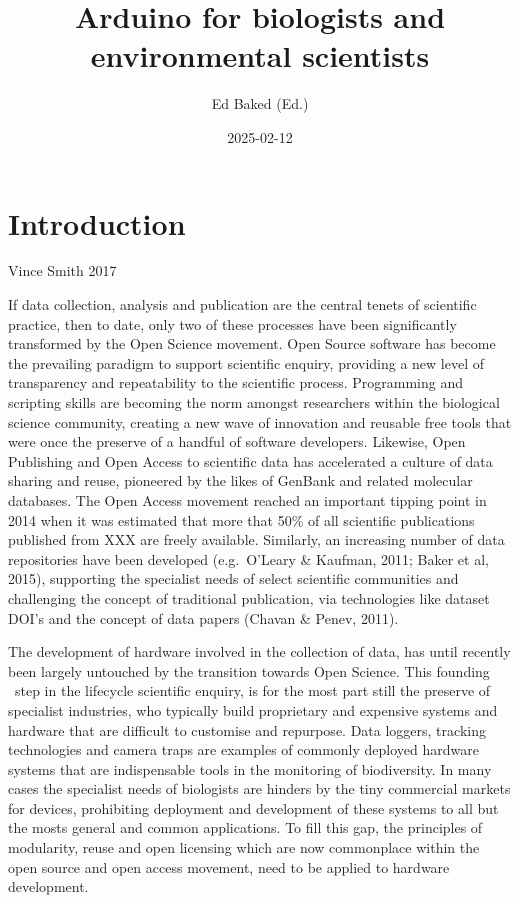 \documentclass[
]{book}
\title{Arduino for biologists and environmental scientists}
\author{Ed Baked (Ed.)}
\date{2025-02-12}
\begin{document}
\maketitle

{
\setcounter{tocdepth}{1}
\tableofcontents
}
\chapter*{Introduction}\label{introduction}

Vince Smith 2017

If data collection, analysis and publication are the central tenets of scientific practice, then to date, only two of these processes have been significantly transformed by the Open Science movement. Open Source software has become the prevailing paradigm to support scientific enquiry, providing a new level of transparency and repeatability to the scientific process. Programming and scripting skills are becoming the norm amongst researchers within the biological science community, creating a new wave of innovation and reusable free tools that were once the preserve of a handful of software developers. Likewise, Open Publishing and Open Access to scientific data has accelerated a culture of data sharing and reuse, pioneered by the likes of GenBank and related molecular databases. The Open Access movement reached an important tipping point in 2014 when it was estimated that more that 50\% of all scientific publications published from XXX are freely available. Similarly, an increasing number of data repositories have been developed (e.g.~O'Leary \& Kaufman, 2011; Baker et al, 2015), supporting the specialist needs of select scientific communities and challenging the concept of traditional publication, via technologies like dataset DOI's and the concept of data papers (Chavan \& Penev, 2011).

The development of hardware involved in the collection of data, has until recently been largely untouched by the transition towards Open Science. This founding ~step in the lifecycle scientific enquiry, is for the most part still the preserve of specialist industries, who typically build proprietary and expensive systems and hardware that are difficult to customise and repurpose. Data loggers, tracking technologies and camera traps are examples of commonly deployed hardware systems that are indispensable tools in the monitoring of biodiversity. In many cases the specialist needs of biologists are hinders by the tiny commercial markets for devices, prohibiting deployment and development of these systems to all but the mosts general and common applications. To fill this gap, the principles of modularity, reuse and open licensing which are now commonplace within the open source and open access movement, need to be applied to hardware development.
\end{document}
